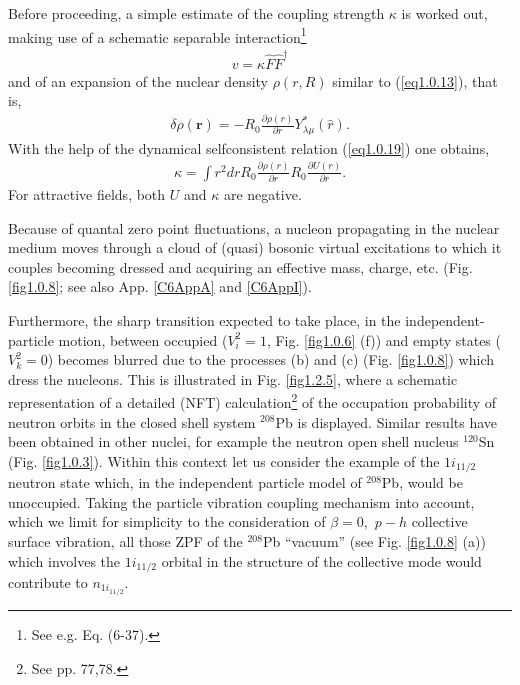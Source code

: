 Before proceeding, a simple estimate of the coupling strength $\kappa$ is worked out, making use of a schematic separable interaction\footnote{See e.g. \cite{Bohr:75} Eq. (6-37).}
\begin{align}\label{eq1.2.9}
v=\kappa\hat F\hat F^\dagger
\end{align}
and of an expansion of the nuclear density $\rho(r,R)$ similar to (\ref{eq1.0.13}), that is,
\begin{align}\label{eq1.2.10}
\delta\rho(\mathbf r)=-R_0\frac{\partial\rho(r)}{\partial r} Y^*_{\lambda\mu}(\hat r).
\end{align}
With the help of the dynamical selfconsistent relation (\ref{eq1.0.19}) one obtains,
\begin{align}\label{eq1.2.11}
\kappa=\int r^2 dr R_0\frac{\partial\rho(r)}{\partial r}R_0\frac{\partial U(r)}{\partial r}.
\end{align}
For attractive fields, both $U$ and $\kappa$ are negative.


Because of quantal zero point fluctuations, a nucleon propagating in the nuclear medium moves through a cloud of (quasi) bosonic  virtual excitations to which it couples becoming dressed and acquiring  an effective mass, charge, etc. (Fig. \ref{fig1.0.8}; see also App. \ref{C6AppA} and \ref{C6AppI}). 


Furthermore, the sharp transition expected to take place, in the independent-particle motion, between occupied ($V^2_i=1$, Fig. \ref{fig1.0.6} (f)) and empty states ($V^2_k=0$) becomes blurred due to the processes (b) and (c) (Fig. \ref{fig1.0.8}) which dress the nucleons. This is illustrated in Fig. \ref{fig1.2.5}, where a schematic representation of a detailed (NFT) calculation\footnote{See \cite{Bortignon:98} pp. 77,78.} of the occupation probability of neutron orbits in the closed shell system $^{208}$Pb is displayed. Similar results have been obtained in other nuclei, for example the neutron open shell nucleus $^{120}$Sn (Fig. \ref{fig1.0.3}). Within this context let us consider the example of the $1i_{11/2}$ neutron state which, in the independent particle model of $^{208}$Pb, would be unoccupied. Taking the particle vibration coupling mechanism into account, which we limit for simplicity to the consideration of $\beta=0,$ $p-h$ collective surface vibration, all those ZPF of the $^{208}$Pb ``vacuum'' (see Fig. \ref{fig1.0.8} (a)) which involves the $1i_{11/2}$ orbital in the structure of the collective mode would contribute to $n_{1i_{11/2}}$.

